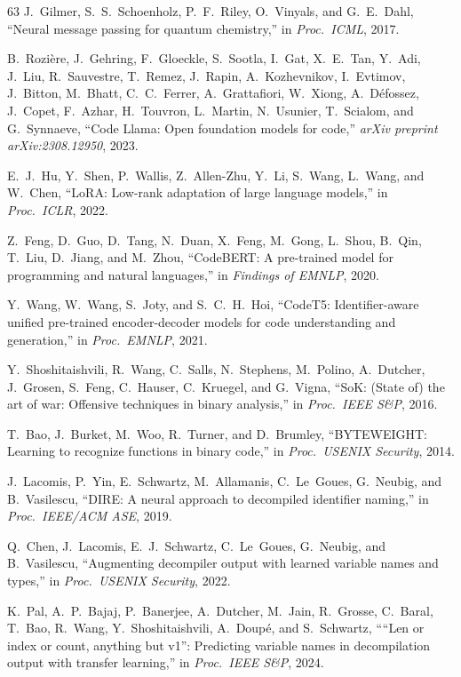 \documentclass[sigconf,nonacm]{acmart}
\begin{document}
{\begin{thebibliography}{63}
J.~Gilmer, S.~S.~Schoenholz, P.~F.~Riley, O.~Vinyals, and G.~E.~Dahl, ``Neural message passing for quantum chemistry,'' in \emph{Proc.\ ICML}, 2017.

B.~Rozi\`{e}re, J.~Gehring, F.~Gloeckle, S.~Sootla, I.~Gat, X.~E.~Tan, Y.~Adi, J.~Liu, R.~Sauvestre, T.~Remez, J.~Rapin, A.~Kozhevnikov, I.~Evtimov, J.~Bitton, M.~Bhatt, C.~C.~Ferrer, A.~Grattafiori, W.~Xiong, A.~D\'{e}fossez, J.~Copet, F.~Azhar, H.~Touvron, L.~Martin, N.~Usunier, T.~Scialom, and G.~Synnaeve, ``Code Llama: Open foundation models for code,'' \emph{arXiv preprint arXiv:2308.12950}, 2023.

E.~J.~Hu, Y.~Shen, P.~Wallis, Z.~Allen-Zhu, Y.~Li, S.~Wang, L.~Wang, and W.~Chen, ``LoRA: Low-rank adaptation of large language models,'' in \emph{Proc.\ ICLR}, 2022.

Z.~Feng, D.~Guo, D.~Tang, N.~Duan, X.~Feng, M.~Gong, L.~Shou, B.~Qin, T.~Liu, D.~Jiang, and M.~Zhou, ``CodeBERT: A pre-trained model for programming and natural languages,'' in \emph{Findings of EMNLP}, 2020.

Y.~Wang, W.~Wang, S.~Joty, and S.~C.~H.~Hoi, ``CodeT5: Identifier-aware unified pre-trained encoder-decoder models for code understanding and generation,'' in \emph{Proc.\ EMNLP}, 2021.

Y.~Shoshitaishvili, R.~Wang, C.~Salls, N.~Stephens, M.~Polino, A.~Dutcher, J.~Grosen, S.~Feng, C.~Hauser, C.~Kruegel, and G.~Vigna, ``SoK: (State of) the art of war: Offensive techniques in binary analysis,'' in \emph{Proc.\ IEEE S\&P}, 2016.

T.~Bao, J.~Burket, M.~Woo, R.~Turner, and D.~Brumley, ``BYTEWEIGHT: Learning to recognize functions in binary code,'' in \emph{Proc.\ USENIX Security}, 2014.

J.~Lacomis, P.~Yin, E.~Schwartz, M.~Allamanis, C.~Le~Goues, G.~Neubig, and B.~Vasilescu, ``DIRE: A neural approach to decompiled identifier naming,'' in \emph{Proc.\ IEEE/ACM ASE}, 2019.

Q.~Chen, J.~Lacomis, E.~J.~Schwartz, C.~Le~Goues, G.~Neubig, and B.~Vasilescu, ``Augmenting decompiler output with learned variable names and types,'' in \emph{Proc.\ USENIX Security}, 2022.

K.~Pal, A.~P.~Bajaj, P.~Banerjee, A.~Dutcher, M.~Jain, R.~Grosse, C.~Baral, T.~Bao, R.~Wang, Y.~Shoshitaishvili, A.~Doup\'{e}, and S.~Schwartz, ````Len or index or count, anything but v1'': Predicting variable names in decompilation output with transfer learning,'' in \emph{Proc.\ IEEE S\&P}, 2024.


\end{thebibliography}}
\end{document}

